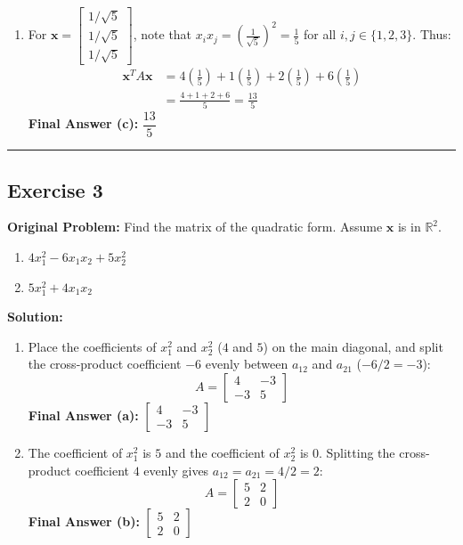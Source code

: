 \documentclass[11pt, letterpaper]{article}
\theoremstyle{definition}
\theoremstyle{remark}
\begin{document}
\begin{enumerate}[label=\alph*.]
    \item For $\mathbf{x} = \begin{bmatrix} 1/\sqrt{5} \\ 1/\sqrt{5} \\ 1/\sqrt{5} \end{bmatrix}$, note that $x_i x_j = \left(\frac{1}{\sqrt{5}}\right)^2 = \frac{1}{5}$ for all $i, j \in \{1, 2, 3\}$. Thus:
    \begin{align*}
        \mathbf{x}^T A \mathbf{x} &= 4\left(\frac{1}{5}\right) + 1\left(\frac{1}{5}\right) + 2\left(\frac{1}{5}\right) + 6\left(\frac{1}{5}\right) \\
        &= \frac{4 + 1 + 2 + 6}{5} = \frac{13}{5}
    \end{align*}
    \textbf{Final Answer (c):} $\dfrac{13}{5}$
\end{enumerate}

\medskip\hrule\medskip

\subsection*{Exercise 3}
\textbf{Original Problem:} Find the matrix of the quadratic form. Assume $\mathbf{x}$ is in $\mathbb{R}^2$.
\begin{enumerate}[label=\alph*.]
    \item $4x_1^2 - 6x_1x_2 + 5x_2^2$
    \item $5x_1^2 + 4x_1x_2$
\end{enumerate}

\textbf{Solution:}
\begin{enumerate}[label=\alph*.]
    \item Place the coefficients of $x_1^2$ and $x_2^2$ ($4$ and $5$) on the main diagonal, and split the cross-product coefficient $-6$ evenly between $a_{12}$ and $a_{21}$ ($-6/2 = -3$):
    \[
    A = \begin{bmatrix} 4 & -3 \\ -3 & 5 \end{bmatrix}
    \]
    \textbf{Final Answer (a):} $\begin{bmatrix} 4 & -3 \\ -3 & 5 \end{bmatrix}$

    \item The coefficient of $x_1^2$ is $5$ and the coefficient of $x_2^2$ is $0$. Splitting the cross-product coefficient $4$ evenly gives $a_{12} = a_{21} = 4/2 = 2$:
    \[
    A = \begin{bmatrix} 5 & 2 \\ 2 & 0 \end{bmatrix}
    \]
    \textbf{Final Answer (b):} $\begin{bmatrix} 5 & 2 \\ 2 & 0 \end{bmatrix}$
\end{enumerate}
\end{document}

